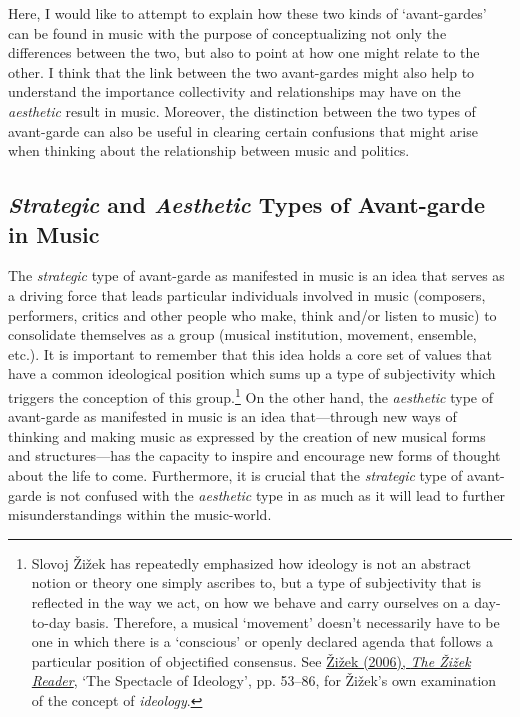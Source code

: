 Here, I would like to attempt to explain how these two kinds of `avant-gardes' can be found in music with the purpose of conceptualizing not only the differences between the two, but also to point at how one might relate to the other. I think that the link between the two avant-gardes might also help to understand the importance collectivity and relationships may have on the \emph{aesthetic} result in music. Moreover, the distinction between the two types of avant-garde can also be useful in clearing certain confusions that might arise when thinking about the relationship between music and politics.  

\subsection*{\emph{Strategic} and \emph{Aesthetic} Types of Avant-garde in Music}

The \emph{strategic} type of avant-garde as manifested in music is an idea that serves as a driving force that leads particular individuals involved in music (composers, performers, critics and other people who make, think and/or listen to music) to consolidate themselves as a group (musical institution, movement, ensemble, etc.). It is important to remember that this idea holds a core set of values that have a common ideological position which sums up a type of subjectivity which triggers the conception of this group.\footnote{Slovoj \v{Z}i\v{z}ek has repeatedly emphasized how ideology is not an abstract notion or theory one simply ascribes to, but a type of subjectivity that is reflected in the way we act, on how we behave and carry ourselves on a day-to-day basis. Therefore, a musical `movement' doesn't necessarily have to be one in which there is a `conscious' or openly declared agenda that follows a particular position of objectified consensus. See \hyperlink{zizekreader}{\v{Z}i\v{z}ek (2006), \emph{The \v{Z}i\v{z}ek Reader}}, `The Spectacle of Ideology', pp. 53--86, for \v{Z}i\v{z}ek's own examination of the concept of \emph{ideology}.} On the other hand,  the \emph{aesthetic} type of avant-garde as manifested in music is an idea that---through new ways of thinking and making music as expressed by the creation of new musical forms and structures---has the capacity to inspire and encourage new forms of thought about the life to come.  Furthermore, it is crucial that the \emph{strategic} type of avant-garde is not confused with the \emph{aesthetic} type in as much as it will lead to further misunderstandings within the music-world. 

